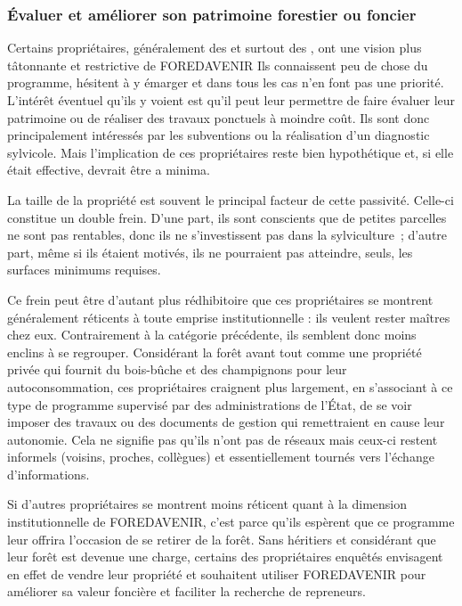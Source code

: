 \documentclass[12pt]{report}
\newcounter{table1}
\begin{document}
\subsubsection{Évaluer et améliorer son patrimoine forestier ou foncier}

Certains propriétaires, généralement des  et surtout des
, ont une vision plus tâtonnante et restrictive de
FOREDAVENIR Ils connaissent peu de chose du programme, hésitent à y émarger et
dans tous les cas n’en font pas une priorité. L’intérêt éventuel qu’ils y voient
est qu’il peut leur permettre de faire évaluer leur patrimoine ou de réaliser
des travaux ponctuels à moindre coût. Ils sont donc principalement intéressés
par les subventions ou la réalisation d’un diagnostic sylvicole. Mais
l’implication de ces propriétaires reste bien hypothétique et, si elle était
effective, devrait être a minima.

La taille de la propriété est souvent le principal facteur de cette passivité.
Celle-ci constitue un double frein. D'une part, ils sont conscients que de petites
parcelles ne sont pas rentables, donc ils ne s'investissent pas dans la
sylviculture~; d'autre part, même si ils étaient motivés, ils ne pourraient pas
atteindre, seuls, les surfaces minimums requises.

Ce frein peut être d’autant plus rédhibitoire que ces propriétaires se montrent
généralement réticents à toute emprise institutionnelle : ils veulent rester
maîtres chez eux. Contrairement à la catégorie précédente, ils semblent donc
moins enclins à se regrouper. Considérant la forêt avant tout comme une
propriété privée qui fournit du bois-bûche et des champignons pour leur
autoconsommation, ces propriétaires craignent plus largement, en s’associant à
ce type de programme supervisé par des administrations de l’État, de se voir
imposer des travaux ou des documents de gestion qui remettraient en cause leur
autonomie. Cela ne signifie pas qu’ils n’ont pas de réseaux mais ceux-ci restent
informels (voisins, proches, collègues) et essentiellement tournés vers
l’échange d’informations.

Si d’autres propriétaires se montrent moins réticent quant à la dimension
institutionnelle de FOREDAVENIR, c’est parce qu’ils espèrent que ce programme
leur offrira l’occasion de se retirer de la forêt. Sans héritiers et considérant
que leur forêt est devenue une charge, certains des propriétaires enquêtés
envisagent en effet de vendre leur propriété et souhaitent utiliser FOREDAVENIR
pour améliorer sa valeur foncière et faciliter la recherche de repreneurs.
\end{document}
